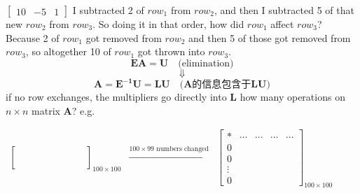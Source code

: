 \documentclass[12pt, a4paper]{article}
\begin{document}
{\begin{math}
\begin{bmatrix}
		10 & -5 & 1
	\end{bmatrix}
\end{math}
\newline
I subtracted 2 of $row_1$ from $row_2$, and then I subtracted 5 of that new $row_2$ from $row_3$. So doing it in that order, how did $row_1$ affect $row_3$? Because 2 of $row_1$ got removed from $row_2$ and then 5 of those got removed from $row_3$, so altogether 10 of $row_1$ got thrown into $row_3$.
\vspace{14pt}
\newline
\begin{displaymath}
	{\mathbf{E}}{\mathbf{A}} = {\mathbf{U}} \quad {\text{(elimination)}}
\end{displaymath}
\begin{displaymath}
	\Downarrow
\end{displaymath}
\begin{displaymath}
	{\mathbf{A}} = {\mathbf{E^{-1}}}{\mathbf{U}} = {\mathbf{L}}{\mathbf{U}} \quad {\text{($\mathbf{A}$的信息包含于$\mathbf{L}$$\mathbf{U}$)}}
\end{displaymath}
\vspace{14pt}
if no row exchanges, the multipliers go directly into ${\mathbf{L}}$
\vspace{14pt}
\newline
how many operations on $n \times n$ matrix $\mathbf{A}$?
\newline
e.g.
\par
\begin{math}
	\begin{aligned}
		\begin{bmatrix}
			\ & \ & \ & \ & \ & \ & \ \\
			\ & \ & \ & \ & \ & \ & \ \\
			\ & \ & \ & \ & \ & \ & \ \\
			\ & \ & \ & \ & \ & \ & \ \\
			\ & \ & \ & \ & \ & \ & \ 
		\end{bmatrix}_{100 \times 100}
		&\xrightarrow{100 \times 99 {\text{ numbers changed}}}&
		\begin{bmatrix}
			* & \cdots & \cdots & \cdots & \cdots \\
			0 & \ & \ & \ & \ \\
			0 & \ & \ & \ & \ \\
			\vdots & \ & \ & \ & \ \\
			0 & \ & \ & \ & \ 
		\end{bmatrix}_{100 \times 100}
		\\

\end{aligned}
\end{math}}
\end{document}
